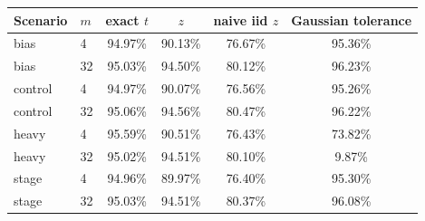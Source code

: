 \begin{tabular}{llcccc}
\toprule
Scenario & $m$ & exact $t$ & $z$ & naive iid $z$ & Gaussian tolerance \\
\midrule
bias & 4 & 94.97\% & 90.13\% & 76.67\% & 95.36\% \\
bias & 32 & 95.03\% & 94.50\% & 80.12\% & 96.23\% \\
control & 4 & 94.97\% & 90.07\% & 76.56\% & 95.26\% \\
control & 32 & 95.06\% & 94.56\% & 80.47\% & 96.22\% \\
heavy & 4 & 95.59\% & 90.51\% & 76.43\% & 73.82\% \\
heavy & 32 & 95.02\% & 94.51\% & 80.10\% & 9.87\% \\
stage & 4 & 94.96\% & 89.97\% & 76.40\% & 95.30\% \\
stage & 32 & 95.03\% & 94.51\% & 80.37\% & 96.08\% \\
\bottomrule
\end{tabular}
